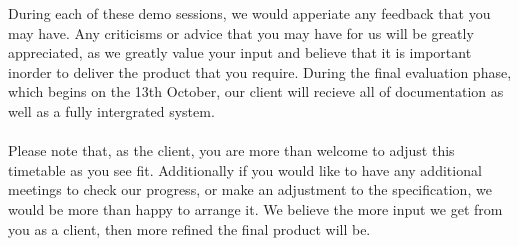 During each of these demo sessions, we would apperiate any feedback that you may have. Any criticisms or advice that you may have for us
will be greatly appreciated, as we greatly value your input and believe that it is important inorder to deliver the product that you require.
During the final evaluation phase, which begins on the 13th October, our client will recieve all of documentation as well as a fully 
intergrated system.\\
\\ 
Please note that, as the client, you are more than welcome to adjust this timetable as you see fit. Additionally if you would like to have any 
additional meetings to check our progress, or make an adjustment to the specification, we would be more than happy to arrange it. We believe 
the more input we get from you as a client, then more refined the final product will be.